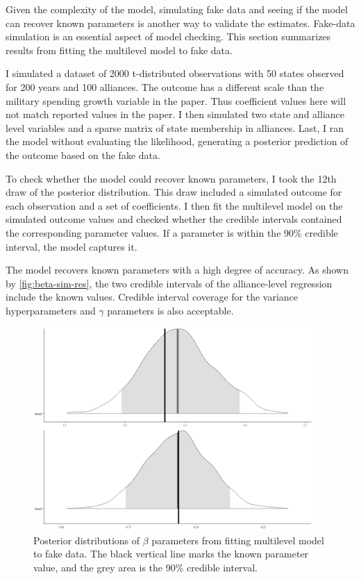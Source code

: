 \documentclass[12pt]{article}
\begin{document}
Given the complexity of the model, simulating fake data and seeing if the model can recover known parameters is another way to validate the estimates. 
Fake-data simulation is an essential aspect of model checking. 
This section summarizes results from fitting the multilevel model to fake data.


I simulated a dataset of 2000 t-distributed observations with 50 states observed for 200 years and 100 alliances. 
The outcome has a different scale than the military spending growth variable in the paper.
Thus coefficient values here will not match reported values in the paper.  
I then simulated two state and alliance level variables and a sparse matrix of state membership in alliances. 
Last, I ran the model without evaluating the likelihood, generating a posterior prediction of the outcome based on the fake data.


To check whether the model could recover known parameters, I took the 12th draw of the posterior distribution.
This draw included a simulated outcome for each observation and a set of coefficients. 
I then fit the multilevel model on the simulated outcome values and checked whether the credible intervals contained the corresponding parameter values. 
If a parameter is within the 90\% credible interval, the model captures it. 


The model recovers known parameters with a high degree of accuracy. 
As shown by \autoref{fig:beta-sim-res}, the two credible intervals of the alliance-level regression include the known values.
Credible interval coverage for the variance hyperparameters and $\gamma$ parameters is also acceptable. 


\begin{figure}[htbp]
	\centering
		\includegraphics[width=0.95\textwidth]{beta-sim-res.png}
	\caption{Posterior distributions of $\beta$ parameters from fitting multilevel model to fake data. The black vertical line marks the known parameter value, and the grey area is the 90\% credible interval.}
	\label{fig:beta-sim-res}
\end{figure}
\end{document}
